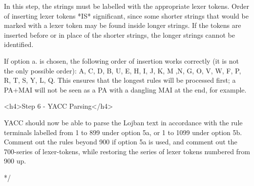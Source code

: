 In this step, the strings must be labelled with the
    appropriate lexer tokens. Order of inserting lexer tokens *IS*
    significant, since some shorter strings that would be marked
    with a lexer token may be found inside longer strings. If the
    tokens are inserted before or in place of the shorter strings,
    the longer strings cannot be identified.

If option a. is chosen, the following order of insertion
    works correctly (it is not the only possible order): A, C, D,
    B, U, E, H, I, J, K, M ,N, G, O, V, W, F, P, R, T, S, Y, L, Q.
    This ensures that the longest rules will be processed first; a
    PA+MAI will not be seen as a PA with a dangling MAI at the end,
    for example.

<h4>Step 6 - YACC Parsing</h4>

YACC should now be able to parse the Lojban text in
    accordance with the rule terminals labelled from 1 to 899 under
    option 5a, or 1 to 1099 under option 5b. Comment out the rules
    beyond 900 if option 5a is used, and comment out the 700-series
    of lexer-tokens, while restoring the series of lexer tokens
    numbered from 900 up.

*/

